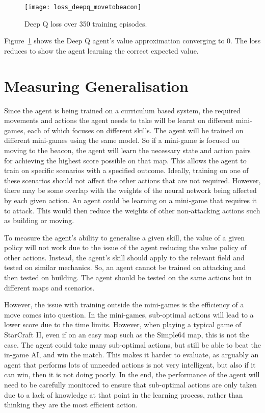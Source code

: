 \begin{figure}[h!]
    \centering
    \texttt{[image: loss\_deepq\_movetobeacon]}
    \caption{Deep Q loss over 350 training episodes.}%
    \label{fig:loss_deepq_movetobeacon}%
\end{figure}


Figure~\ref{fig:loss_deepq_movetobeacon} shows the Deep Q agent's value
approximation converging to 0. The loss reduces to show the agent learning the
correct expected value.

\section{Measuring Generalisation}

Since the agent is being trained on a curriculum based system, the required
movements and actions the agent needs to take will be learnt on different
mini-games, each of which focuses on different skills. The agent will be trained
on different mini-games using the same model. So if a mini-game is focused on
moving to the beacon, the agent will learn the necessary state and action pairs
for achieving the highest score possible on that map. This allows the agent to
train on specific scenarios with a specified outcome. Ideally, training on one
of these scenarios should not affect the other actions that are not required.
However, there may be some overlap with the weights of the neural network being affected
by each given action. An agent could be learning on a mini-game that requires
it to attack. This would then reduce the weights of other non-attacking actions
such as building or moving.

To measure the agent's ability to generalise a given skill, the value of
a given policy will not work due to the issue of the agent reducing the value
policy of other actions. Instead, the agent's skill should apply to the
relevant field and tested on similar mechanics. So, an agent cannot be trained
on attacking and then tested on building. The agent should be tested on the same
actions but in different maps and scenarios.

However, the issue with training outside the mini-games is the
efficiency of a move comes into question. In the mini-games, sub-optimal actions
will lead to a lower score due to the time limits. However, when playing a
typical game of StarCraft II, even if on an easy map such as the Simple64 map,
this is not the case. The agent could take many sub-optimal actions, but still
be able to beat the in-game AI, and win the match. This makes it harder to
evaluate, as arguably an agent that performs lots of unneeded actions is not very
intelligent, but also if it can win, then it is not doing poorly. In the
end, the performance of the agent will need to be carefully monitored to ensure
that sub-optimal actions are only taken due to a lack of knowledge at that point
in the learning process, rather than thinking they are the most efficient
action.
